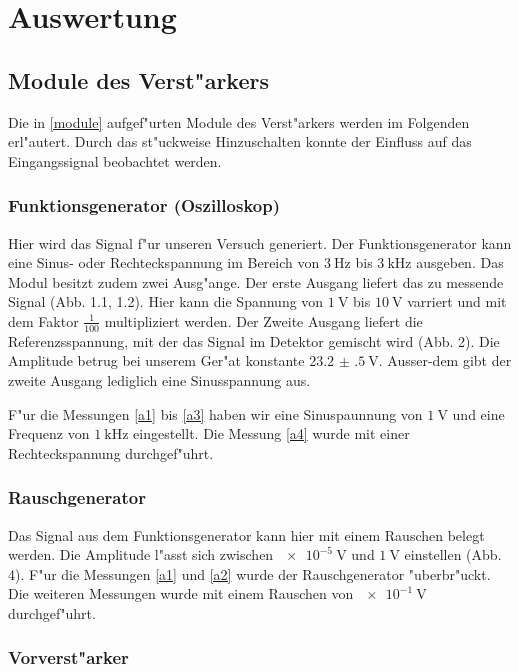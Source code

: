 \documentclass{scrartcl}
\begin{document}
	\section{Auswertung}

		\subsection{Module des Verst"arkers}

			Die in \ref{module} aufgef"urten Module des Verst"arkers werden im Folgenden erl"autert.
			Durch das st"uckweise Hinzuschalten konnte der Einfluss auf das Eingangssignal beobachtet werden.

			\subsubsection{Funktionsgenerator (Oszilloskop)}

				Hier wird das Signal f"ur unseren Versuch generiert.
				Der Funktionsgenerator kann eine Sinus- oder Rechteckspannung im Bereich von $\SI{3}{\hertz}$ bis $\SI{3}{\kilo\hertz}$ ausgeben.
				Das Modul besitzt zudem zwei Ausg"ange. Der erste Ausgang liefert das zu messende Signal (Abb. 1.1, 1.2).
				Hier kann die Spannung von $\SI{1}{\volt}$ bis $\SI{10}{\volt}$ varriert und mit dem Faktor $\frac{1}{100}$ multipliziert werden.
				Der Zweite Ausgang liefert die Referenzsspannung, mit der das Signal im Detektor gemischt wird (Abb. 2).
				Die Amplitude betrug bei unserem Ger"at konstante $\SI{23.2(5)}{\volt}$.
				Ausser-dem gibt der zweite Ausgang lediglich eine Sinusspannung aus.

				F"ur die Messungen \ref{a1} bis \ref{a3} haben wir eine Sinuspaunnung von $\SI{1}{\volt}$ und eine Frequenz von $\SI{1}{\kilo\hertz}$ eingestellt.
				Die Messung \ref{a4} wurde mit einer Rechteckspannung durchgef"uhrt.

			\subsubsection{Rauschgenerator}

				Das Signal aus dem Funktionsgenerator kann hier mit einem Rauschen belegt werden.
				Die Amplitude l"asst sich zwischen $\SI{e-5}{\volt}$ und $\SI{1}{\volt}$ einstellen (Abb. 4).
				F"ur die Messungen \ref{a1} und \ref{a2} wurde der Rauschgenerator "uberbr"uckt. Die weiteren Messungen wurde mit einem Rauschen von $\SI{e-1}{\volt}$ durchgef"uhrt.

			\subsubsection{Vorverst"arker}
\end{document}
